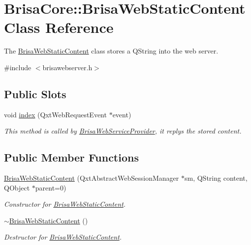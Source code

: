 \hypertarget{classBrisaCore_1_1BrisaWebStaticContent}{
\section{BrisaCore::BrisaWebStaticContent Class Reference}
\label{classBrisaCore_1_1BrisaWebStaticContent}
}


The \hyperlink{classBrisaCore_1_1BrisaWebStaticContent}{BrisaWebStaticContent} class stores a QString into the web server.  


{\ttfamily \#include $<$brisawebserver.h$>$}\subsection*{Public Slots}
\begin{DoxyCompactItemize}
\item 
void \hyperlink{classBrisaCore_1_1BrisaWebStaticContent_ac66701b1cebdc7e4981de7d4b4034093}{index} (QxtWebRequestEvent $\ast$event)
\begin{DoxyCompactList}\small\item\em This method is called by \hyperlink{classBrisaCore_1_1BrisaWebServiceProvider}{BrisaWebServiceProvider}, it replys the stored content. \item\end{DoxyCompactList}\end{DoxyCompactItemize}
\subsection*{Public Member Functions}
\begin{DoxyCompactItemize}
\item 
\hyperlink{classBrisaCore_1_1BrisaWebStaticContent_a7db7885aeb5c92c2a78f14ee627e9786}{BrisaWebStaticContent} (QxtAbstractWebSessionManager $\ast$sm, QString content, QObject $\ast$parent=0)
\begin{DoxyCompactList}\small\item\em Constructor for \hyperlink{classBrisaCore_1_1BrisaWebStaticContent}{BrisaWebStaticContent}. \item\end{DoxyCompactList}\item 
\hyperlink{classBrisaCore_1_1BrisaWebStaticContent_a64e24afe9b291ccbb9e9cd37a39ab150}{$\sim$BrisaWebStaticContent} ()
\begin{DoxyCompactList}\small\item\em Destructor for \hyperlink{classBrisaCore_1_1BrisaWebStaticContent}{BrisaWebStaticContent}. \item\end{DoxyCompactList}\end{DoxyCompactItemize}



